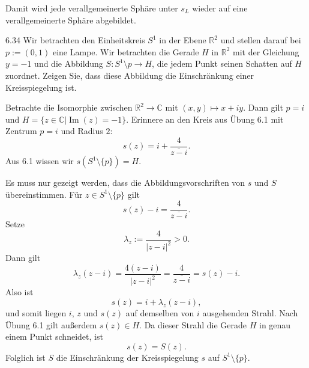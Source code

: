 Damit wird jede verallgemeinerte Sphäre unter \(s_L\) wieder auf eine
verallgemeinerte Sphäre abgebildet.

\newpage
\begin{exercise}{6.3}{4}
    Wir betrachten den Einheitskreis $S^1$ in der Ebene $\mathbb R^2$ und stellen darauf bei $p := (0, 1)$ eine Lampe.
    Wir betrachten die Gerade $H$ in $\mathbb R^2$ mit der Gleichung $y = -1$ und die Abbildung $S:S^1\setminus p \rightarrow H$, die jedem Punkt seinen Schatten auf $H$ zuordnet.
    Zeigen Sie, dass diese Abbildung die Einschränkung einer Kreisspiegelung ist.
\end{exercise}

Betrachte die Isomorphie zwischen $\mathbb R^2 \rightarrow \mathbb C$ mit $(x,y) \mapsto x + iy$.
Dann gilt $p = i$ und $H = \{z \in \mathbb C |  \operatorname{Im}(z)=-1\}$.
Erinnere an den Kreis aus Übung 6.1 mit Zentrum $p=i$ und Radius $2$:
\[
    s(z) = i+\frac{4}{\overline{z-i}}.
\]
Aus 6.1 wissen wir $s(S^1\setminus\{p\}) = H$.

Es muss nur gezeigt werden, dass die Abbildungsvorschriften von $s$ und $S$ übereinstimmen.
Für \(z\in S^1\setminus\{p\}\) gilt
\[
    s(z)-i
    =
    \frac{4}{\overline{z-i}}.
\]
Setze
\[
    \lambda_z:=\frac{4}{|z-i|^2}>0.
\]
Dann gilt
\[
    \lambda_z(z-i)
    =
    \frac{4(z-i)}{|z-i|^2}
    =
    \frac{4}{\overline{z-i}}
    =
    s(z)-i.
\]
Also ist
\[
    s(z)=i+\lambda_z(z-i),
\]
und somit liegen \(i\), \(z\) und \(s(z)\) auf demselben von \(i\)
ausgehenden Strahl. Nach Übung 6.1 gilt au\ss erdem \(s(z)\in H\).
Da dieser Strahl die Gerade \(H\) in genau einem Punkt schneidet,
ist
\[
    s(z)=S(z).
\]
Folglich ist \(S\) die Einschränkung der Kreisspiegelung \(s\) auf
\(S^1\setminus\{p\}\).
